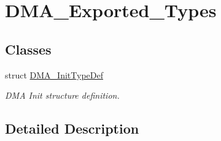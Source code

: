 \hypertarget{group___d_m_a___exported___types}{}\section{D\+M\+A\+\_\+\+Exported\+\_\+\+Types}
\label{group___d_m_a___exported___types}
\subsection*{Classes}
\begin{DoxyCompactItemize}
\item 
struct \hyperlink{struct_d_m_a___init_type_def}{D\+M\+A\+\_\+\+Init\+Type\+Def}
\begin{DoxyCompactList}\small\item\em D\+MA Init structure definition. \end{DoxyCompactList}\end{DoxyCompactItemize}


\subsection{Detailed Description}
